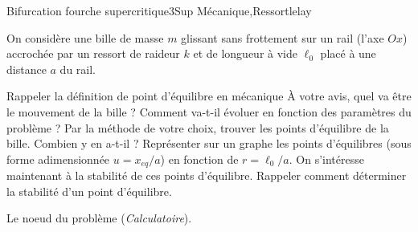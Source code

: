 
\begin{exercise}{Bifurcation fourche supercritique}{3}{Sup}
{Mécanique,Ressort}{lelay}

On considère une bille de masse $m$ glissant sans frottement sur un rail (l'axe $Ox$) accrochée par un ressort de raideur $k$ et de longueur à vide $\ell_0$ placé à une distance $a$ du rail.
\begin{questions}
    \questioncours Rappeler la définition de point d'équilibre en mécanique
    \question À votre avis, quel va être le mouvement de la bille ? Comment va-t-il évoluer en fonction des paramètres du problème ?
    \question Par la méthode de votre choix, trouver les points d'équilibre de la bille. Combien y en a-t-il ?
    \question Représenter sur un graphe les points d'équilibres (sous forme adimensionnée $u=x_{eq}/a$) en fonction de $r = \ell_0/a$.
    \question On s'intéresse maintenant à la stabilité de ces points d'équilibre. Rappeler comment déterminer la stabilité d'un point d'équilibre. 
    \question\textsf{Le noeud du problème (\emph{Calculatoire})}.
\end{questions}
\end{exercise}
